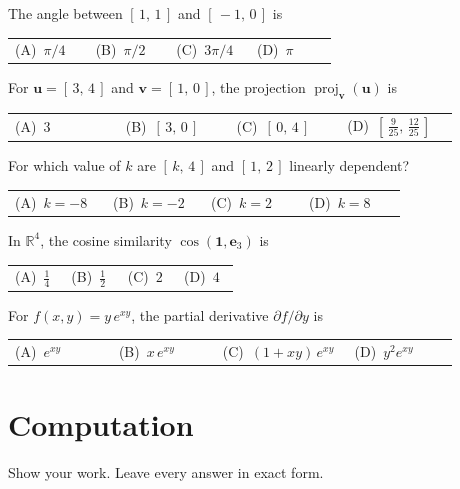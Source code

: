 \documentclass[11pt]{article}
\makeatletter
\newcommand{\fourch}[4]{\par\smallskip\noindent
  \begin{tabular}{@{}*{4}{>{\raggedright\arraybackslash}p{0.22\linewidth}}@{}}
  (A)\ #1 & (B)\ #2 & (C)\ #3 & (D)\ #4
  \end{tabular}\par}
\newcommand{\R}{\mathbb{R}}
\newcommand{\vc}[1]{\mathbf{#1}}
\newcommand{\one}{\mathbf{1}}
\newcommand{\proj}[2]{\operatorname{proj}_{#1}(#2)}
\makeatother
\begin{document}
\newpage
\begin{tfitems}[start=4]
  \item The angle between $[\,1,\,1\,]$ and $[\,-1,\,0\,]$ is
        \fourch{$\pi/4$}{$\pi/2$}{$3\pi/4$}{$\pi$}
        \vfill
  \item For $\vc{u}=[\,3,\,4\,]$ and $\vc{v}=[\,1,\,0\,]$, the projection
        $\proj{\vc{v}}{\vc{u}}$ is
        \fourch{$3$}{$[\,3,\,0\,]$}{$[\,0,\,4\,]$}
               {$[\,\tfrac{9}{25},\,\tfrac{12}{25}\,]$}
        \vfill
  \item For which value of $k$ are $[\,k,\,4\,]$ and $[\,1,\,2\,]$ linearly
        dependent?
        \fourch{$k=-8$}{$k=-2$}{$k=2$}{$k=8$}
        \vfill
\end{tfitems}

\newpage
\begin{tfitems}[start=7]
  \item In $\R^{4}$, the cosine similarity $\cos(\one,\vc{e}_3)$ is
        \fourch{$\tfrac14$}{$\tfrac12$}{$2$}{$4$}
        \vfill
  \item For $f(x,y)=y\,e^{xy}$, the partial derivative
        $\partial f/\partial y$ is
        \fourch{$e^{xy}$}{$x\,e^{xy}$}{$(1+xy)\,e^{xy}$}{$y^{2}e^{xy}$}
        \vfill
\end{tfitems}

\newpage
\section{Computation}
Show your work. Leave every answer in exact form.
\end{document}
